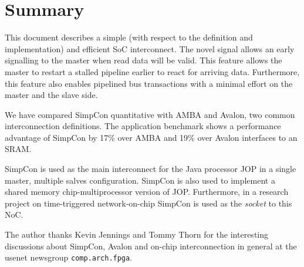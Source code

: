 \section{Summary}

This document describes a simple (with respect to the definition and
implementation) and efficient SoC interconnect. The novel signal
 allows an early signalling to the master when read
data will be valid. This feature allows the master to restart a
stalled pipeline earlier to react for arriving data. Furthermore,
this feature also enables pipelined bus transactions with a minimal
effort on the master and the slave side.

We have compared SimpCon quantitative with AMBA and Avalon, two
common interconnection definitions. The application benchmark shows
a performance advantage of SimpCon by 17\% over AMBA and 19\% over
Avalon interfaces to an SRAM.

SimpCon is used as the main interconnect for the Java processor JOP
in a single master, multiple salves configuration. SimpCon is also
used to implement a shared memory chip-multiprocessor version of
JOP. Furthermore, in a research project on time-triggered
network-on-chip \cite{jop:ttnoc} SimpCon is used as the
\emph{socket} to this NoC.

The author thanks Kevin Jennings and Tommy Thorn for the interesting
discussions about SimpCon, Avalon and on-chip interconnection in
general at the usenet newsgroup \texttt{comp.arch.fpga}.
